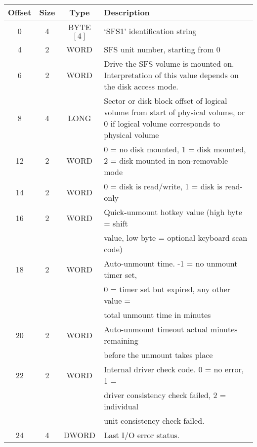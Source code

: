 \begin{center}
\begin{tabular}{|c|c|c|p{230pt}|}
\hline
    Offset & Size &   Type     &   Description\\
\hline
       0   &   4  &   BYTE$[ 4 ]$&   `SFS1' identification string\\
       4   &   2  &   WORD     &   SFS unit number, starting from 0\\
       6   &   2  &   WORD     &   Drive the SFS volume is mounted on.
				   Interpretation of this value depends on the
				   disk access mode.\\
       8   &   4  &   LONG     &   Sector or disk block offset of logical volume 
                                   from start of physical volume, or 0 if logical  
                                   volume corresponds to physical volume\\
      12   &   2  &   WORD     &   0 = no disk mounted, 1 = disk mounted, 2 = disk
                                   mounted in non-removable mode\\
      14   &   2  &   WORD     &   0 = disk is read/write, 1 = disk is read-only\\
      16   &   2  &   WORD     &   Quick-unmount hotkey value (high byte = shift\\
           &      &            &   value, low byte = optional keyboard scan code)\\
      18   &   2  &   WORD     &   Auto-unmount time.  -1 = no unmount timer set,\\
           &      &            &   0 = timer set but expired, any other value =\\
           &      &            &   total unmount time in minutes\\
      20   &   2  &   WORD     &   Auto-unmount timeout actual minutes remaining\\
           &      &            &   before the unmount takes place\\
      22   &   2  &   WORD     &   Internal driver check code.  0 = no error, 1 =\\
           &      &            &   driver consistency check failed, 2 = individual\\
           &      &            &   unit consistency check failed.\\
      24   &   4  &   DWORD    &   Last I/O error status.\\
\hline
\end{tabular}
\end{center}

